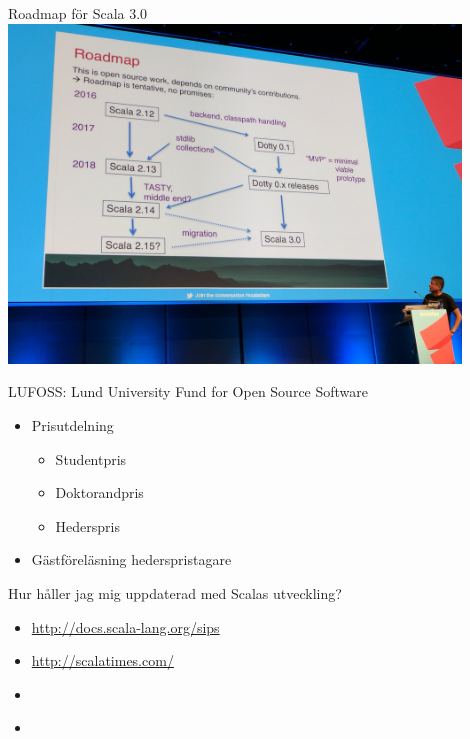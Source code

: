 \begin{Slide}{Roadmap för Scala 3.0}
  \includegraphics[width=0.9\textwidth]{../img/w14/scala-dotty-roadmap-odersky.jpeg}
\end{Slide}

\begin{Slide}{LUFOSS: Lund University Fund for Open Source Software}
\begin{itemize}
  \item Prisutdelning
  \begin{itemize}
    \item Studentpris
    \item Doktorandpris
    \item Hederspris
  \end{itemize}
  \item Gästföreläsning hederspristagare
\end{itemize}
\end{Slide}


\begin{Slide}{Hur håller jag mig uppdaterad med Scalas utveckling?}
\begin{itemize}
  \item \url{http://docs.scala-lang.org/sips}
  \item \url{http://scalatimes.com/}
  \item \url{}
  \item \url{}
\end{itemize}
\end{Slide}



